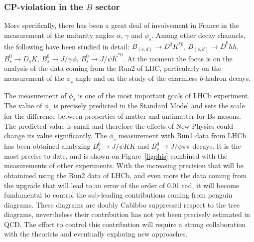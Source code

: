 \subsubsection*{CP-violation in the $B$ sector}
More specifically, there has been a great deal of involvement in France in the measurement of the unitarity angles
$\alpha$, $\gamma$ and $\phi_{s}$. Among other decay channels, the following
have been studied in detail:
$B_{(s,d)}\to D^{0} K^{*0}$, $B_{(s,d)}\to\bar{D}^{0} hh$, $B^{0}_{s} \to
D_{s} K$, $B^{0}_{s} \to J/\psi\phi$,
$B^{0}_{s} \to J/\psi\bar{K}^{*0}$. 
At the moment the focus is on the analysis of the data coming from the Run2 of LHC, particularly on the measurement of the $\phi_{s}$ angle and on the study of the charmless $b$-hadron decays. 


The measurement of $\phi_{s}$ is one of the most important goals of LHCb experiment. The value of $\phi_{s}$ is precisely predicted in the Standard Model and sets the scale for the difference between properties of matter and antimatter for Bs mesons. The predicted value is small and therefore the effects of New Physics could change its value significantly. The $\phi_{s}$ measurement with Run1 data from LHCb has been obtained analyzing $B^{0}_{s} \to J/\psi K K$ and $B^{0}_{s} \to J/\psi \pi \pi$ decays. It  is the most precise to date, and is shown on Figure~\ref{figphis} combined with the measurements of other experiments. With the increasing precision that will be obtainined using the Run2 data of LHCb, and even more the data coming from the upgrade that will lead to an error of the order of 0.01 rad, it will become fundamental to control the sub-leading contributions coming from penguin diagrams. These diagrams are doubly Cabibbo suppressed respect to the tree diagrams, nevertheless their contribution has not yet been precisely estimated in QCD.  The effort to control this contribution will require a strong collaboration with the theorists and eventually exploring new approaches. 


